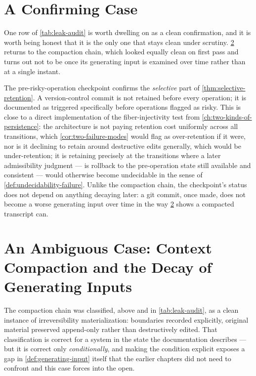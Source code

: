 \documentclass[11pt]{book}
\theoremstyle{plain}
\theoremstyle{definition}
\theoremstyle{remark}
\begin{document}
\section{A Confirming Case}

One row of \cref{tab:leak-audit} is worth dwelling on as a clean
confirmation, and it is worth being honest that it is the only one
that stays clean under scrutiny. \cref{sec:compaction-ambiguous}
returns to the compaction chain, which looked equally clean on first
pass and turns out not to be once its generating input is examined
over time rather than at a single instant.

The pre-risky-operation checkpoint confirms the \emph{selective} part
of \cref{thm:selective-retention}. A version-control commit is not
retained before every operation; it is documented as triggered
specifically before operations flagged as risky. This is close to a
direct implementation of the fiber-injectivity test from
\cref{ch:two-kinds-of-persistence}: the architecture is not paying
retention cost uniformly across all transitions, which
\cref{cor:two-failure-modes} would flag as over-retention if it were,
nor is it declining to retain around destructive edits generally,
which would be under-retention; it is retaining precisely at the
transitions where a later admissibility judgment --- is rollback to
the pre-operation state still available and consistent --- would
otherwise become undecidable in the sense of
\cref{def:undecidability-failure}. Unlike the compaction chain, the
checkpoint's status does not depend on anything decaying later: a
git commit, once made, does not become a worse generating input over
time in the way \cref{sec:compaction-ambiguous} shows a compacted
transcript can.

\section{An Ambiguous Case: Context Compaction and the Decay of Generating Inputs}
\label{sec:compaction-ambiguous}

The compaction chain was classified, above and in \cref{tab:leak-audit},
as a clean instance of irreversibility materialization: boundaries
recorded explicitly, original material preserved append-only rather
than destructively edited. That classification is correct for a
system in the state the documentation describes --- but it is correct
only \emph{conditionally}, and making the condition explicit exposes a
gap in \cref{def:generating-input} itself that the earlier chapters did
not need to confront and this case forces into the open.
\end{document}
